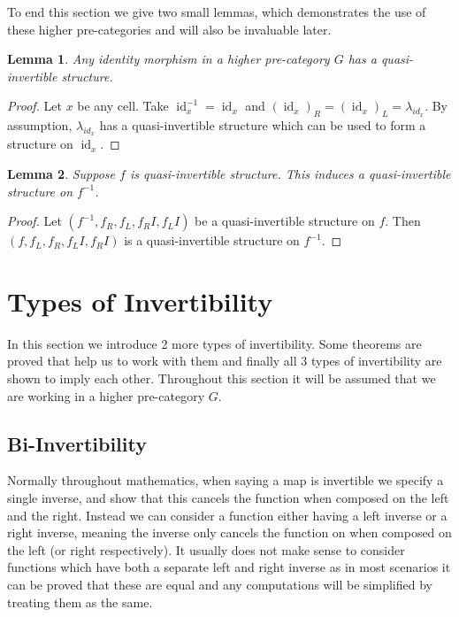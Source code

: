 \documentclass{article}
\newtheorem{lemma}{Lemma}
\theoremstyle{definition}
\theoremstyle{remark}
\DeclareMathOperator{\id}{id}
\newcommand{\inv}[1]{#1^{-1}}
\begin{document}
To end this section we give two small lemmas, which demonstrates the use of these higher pre-categories and will also be invaluable later.

\begin{lemma}\label{identity}
  Any identity morphism in a higher pre-category \(G\) has a quasi-invertible structure.
\end{lemma}

\begin{proof}
  Let \(x\) be any cell. Take \(\inv {\id_x} = \id_x\) and \({(\id_x)}_R = {(\id_x)}_L = \lambda_{id_x}\). By assumption, \(\lambda_{id_x}\) has a quasi-invertible structure which can be used to form a structure on \(\id_x\).
\end{proof}

\begin{lemma}\label{inverse-invert}
  Suppose \(f\) is quasi-invertible structure. This induces a quasi-invertible structure on \(\inv f\).
\end{lemma}

\begin{proof}
  Let \((\inv f, f_R, f_L, f_R{}I, f_L{}I)\) be a quasi-invertible structure on \(f\). Then \((f , f_L, f_R, f_L{}I, f_R{}I)\) is a quasi-invertible structure on \(\inv f\).
\end{proof}

\section{Types of Invertibility}\label{sec:invertibility}

In this section we introduce 2 more types of invertibility. Some theorems are proved that help us to work with them and finally all 3 types of invertibility are shown to imply each other. Throughout this section it will be assumed that we are working in a higher pre-category \(G\).

\subsection{Bi-Invertibility}\label{sec:bi-invertibility}

Normally throughout mathematics, when saying a map is invertible we specify a single inverse, and show that this cancels the function when composed on the left and the right. Instead we can consider a function either having a left inverse or a right inverse, meaning the inverse only cancels the function on when composed on the left (or right respectively). It usually does not make sense to consider functions which have both a separate left and right inverse as in most scenarios it can be proved that these are equal and any computations will be simplified by treating them as the same.
\end{document}
